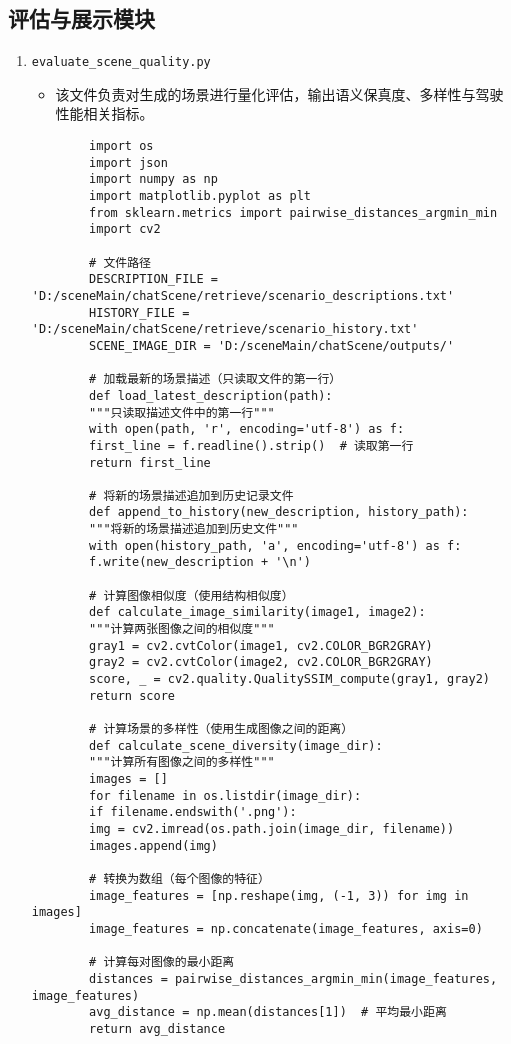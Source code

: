 \subsection*{评估与展示模块}
\begin{enumerate}
	\item \texttt{evaluate\_scene\_quality.py}
	\begin{itemize}
		\item 该文件负责对生成的场景进行量化评估，输出语义保真度、多样性与驾驶性能相关指标。
	\end{itemize}
	\begin{verbatim}
		import os
		import json
		import numpy as np
		import matplotlib.pyplot as plt
		from sklearn.metrics import pairwise_distances_argmin_min
		import cv2
		
		# 文件路径
		DESCRIPTION_FILE = 'D:/sceneMain/chatScene/retrieve/scenario_descriptions.txt'
		HISTORY_FILE = 'D:/sceneMain/chatScene/retrieve/scenario_history.txt'
		SCENE_IMAGE_DIR = 'D:/sceneMain/chatScene/outputs/'
		
		# 加载最新的场景描述（只读取文件的第一行）
		def load_latest_description(path):
		"""只读取描述文件中的第一行"""
		with open(path, 'r', encoding='utf-8') as f:
		first_line = f.readline().strip()  # 读取第一行
		return first_line
		
		# 将新的场景描述追加到历史记录文件
		def append_to_history(new_description, history_path):
		"""将新的场景描述追加到历史文件"""
		with open(history_path, 'a', encoding='utf-8') as f:
		f.write(new_description + '\n')
		
		# 计算图像相似度（使用结构相似度）
		def calculate_image_similarity(image1, image2):
		"""计算两张图像之间的相似度"""
		gray1 = cv2.cvtColor(image1, cv2.COLOR_BGR2GRAY)
		gray2 = cv2.cvtColor(image2, cv2.COLOR_BGR2GRAY)
		score, _ = cv2.quality.QualitySSIM_compute(gray1, gray2)
		return score
		
		# 计算场景的多样性（使用生成图像之间的距离）
		def calculate_scene_diversity(image_dir):
		"""计算所有图像之间的多样性"""
		images = []
		for filename in os.listdir(image_dir):
		if filename.endswith('.png'):
		img = cv2.imread(os.path.join(image_dir, filename))
		images.append(img)
		
		# 转换为数组（每个图像的特征）
		image_features = [np.reshape(img, (-1, 3)) for img in images]
		image_features = np.concatenate(image_features, axis=0)
		
		# 计算每对图像的最小距离
		distances = pairwise_distances_argmin_min(image_features, image_features)
		avg_distance = np.mean(distances[1])  # 平均最小距离
		return avg_distance
		

\end{verbatim}
\end{enumerate}
